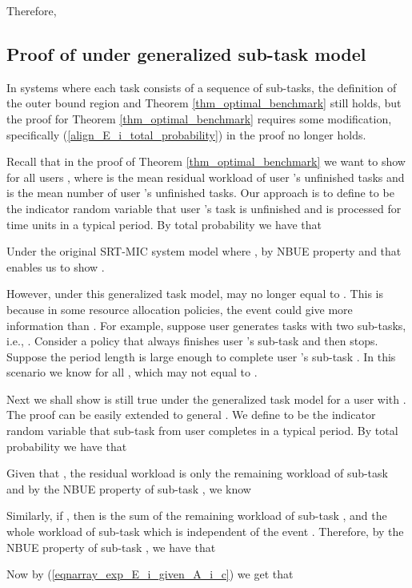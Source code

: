 \documentclass[prodmode,acmtompecs]{acmsmall}
\newcommand{\myComments}[1]{}
\newif\iftompecsextended
\newcommand{\tompecsextendedStart}{\iftompecsextended  \myComments{TOMPECS extended version: }}
\newcommand{\commentEnd}{\myComments{End}}
\begin{document}
Therefore, 

\commentEnd\fi

\tompecsextendedStart
\subsection{Proof of  under generalized sub-task model}
\label{appendix_pf_R_OB_subtask_model}
In systems where each task consists of a sequence of sub-tasks, the definition of the outer bound region  and Theorem \ref{thm_optimal_benchmark} still holds, but the proof for Theorem \ref{thm_optimal_benchmark} requires some modification, specifically (\ref{align_E_i_total_probability}) in the proof no longer holds. 

Recall that in the proof of Theorem \ref{thm_optimal_benchmark} we want to show  for all users , where  is the mean residual workload of user 's unfinished tasks and  is the mean number of user 's unfinished tasks. Our approach is to define  to be the indicator random variable that user 's task is unfinished and is processed for  time units in a typical period. 
By total probability we have that 

Under the original SRT-MIC  system model where , by NBUE property  and that enables us to show . 

However, under this generalized task model,  may no longer equal to . This is because in some resource allocation policies, the event  could give more information than . For example, suppose user  generates tasks with two sub-tasks, i.e., . Consider a policy that always finishes user 's sub-task  and then stops. Suppose the period length  is large enough to complete user 's sub-task . In this scenario we know for all ,  which may not equal to . 

Next we shall show  is still true under the generalized task model for a user  with . The proof can be easily extended to general . We define  to be the indicator random variable that sub-task  from user  completes in a typical period. By total probability we have that


Given that , the residual workload  is only the remaining workload of sub-task  and by the NBUE property of sub-task , we know

Similarly, if , then  is the sum of the remaining workload of sub-task , and the whole workload of sub-task  which is independent of the event . Therefore, by the NBUE property of sub-task , we have that


Now by (\ref{eqnarray_exp_E_i_given_A_i_c}) we get that
\end{document}
